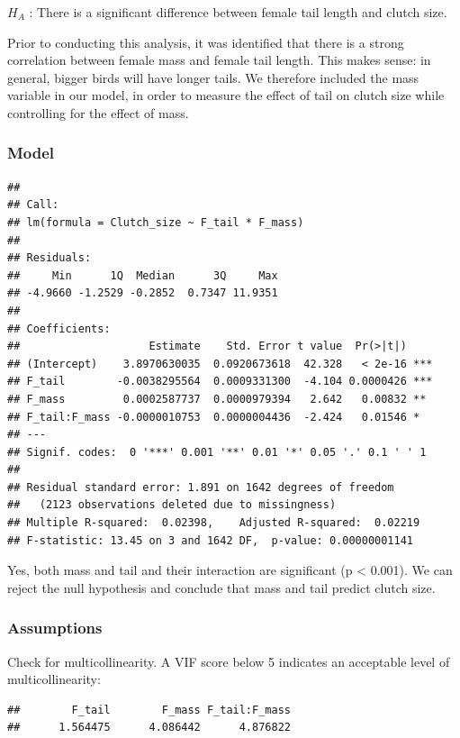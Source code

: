 \documentclass[
  12pt,
]{article}
\begin{document}
\(H_A\) : There is a significant difference between female tail length
and clutch size.

Prior to conducting this analysis, it was identified that there is a
strong correlation between female mass and female tail length. This
makes sense: in general, bigger birds will have longer tails. We
therefore included the mass variable in our model, in order to measure
the effect of tail on clutch size while controlling for the effect of
mass.

\hypertarget{model}{%
\subsubsection{Model}\label{model}}

\begin{verbatim}
## 
## Call:
## lm(formula = Clutch_size ~ F_tail * F_mass)
## 
## Residuals:
##     Min      1Q  Median      3Q     Max 
## -4.9660 -1.2529 -0.2852  0.7347 11.9351 
## 
## Coefficients:
##                    Estimate    Std. Error t value  Pr(>|t|)    
## (Intercept)    3.8970630035  0.0920673618  42.328   < 2e-16 ***
## F_tail        -0.0038295564  0.0009331300  -4.104 0.0000426 ***
## F_mass         0.0002587737  0.0000979394   2.642   0.00832 ** 
## F_tail:F_mass -0.0000010753  0.0000004436  -2.424   0.01546 *  
## ---
## Signif. codes:  0 '***' 0.001 '**' 0.01 '*' 0.05 '.' 0.1 ' ' 1
## 
## Residual standard error: 1.891 on 1642 degrees of freedom
##   (2123 observations deleted due to missingness)
## Multiple R-squared:  0.02398,    Adjusted R-squared:  0.02219 
## F-statistic: 13.45 on 3 and 1642 DF,  p-value: 0.00000001141
\end{verbatim}

Yes, both mass and tail and their interaction are significant (p
\textless{} 0.001). We can reject the null hypothesis and conclude that
mass and tail predict clutch size.

\hypertarget{assumptions}{%
\subsubsection{Assumptions}\label{assumptions}}

Check for multicollinearity. A VIF score below 5 indicates an acceptable
level of multicollinearity:

\begin{verbatim}
##        F_tail        F_mass F_tail:F_mass 
##      1.564475      4.086442      4.876822
\end{verbatim}
\end{document}
